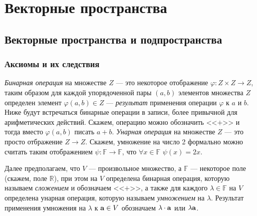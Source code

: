 \chapter{Векторные пространства}\label{lin_prostr}

\section{Векторные пространства и подпространства}

\subsection{Аксиомы и их следствия}

{\it Бинарная операция} на множестве $Z$ --- это некоторое отображение $\varphi : Z \times Z \to Z$,
таким образом для каждой упорядоченной пары $(a, b)$ элементов множества $Z$ определен элемент $\varphi (a, b)\in Z$ --- 
{\it результат} применения операции $\varphi$ к $a$ и $b$.
Ниже будут встречаться бинарные операции в записи, более привычной для арифметических действий. Скажем, операцию можно обозначить
<<$+$>>  и тогда вместо $\varphi (a, b)$ писать $a+b$.
{\it Унарная операция} на множестве $Z$ --- это просто отбражение $Z \to Z$. Скажем, умножение на число 2 
формально можно считать
таким отображением $\psi : \mathbb{F} \to \mathbb{F}$, что $\forall x\in \mathbb{F}$ $ \psi (x) = 2x$.

Далее предполагаем, что $V$ --- произвольное множество, а $\mathbb{F}$ --- 
некоторое поле (скажем, поле $\mathbb{R}$), при этом  на $V$  определена бинарная операция, которую называем
{\it сложением} и обозначаем <<$+$>>, а также  для каждого $\lambda \in \mathbb{F}$ на 
$V$ определена унарная операция, которую называем {\it умножением} на $\lambda$. 
Результат применения умножения на $\lambda$ к  $\mathbf{a} \in V$ обозначаем $\lambda \cdot \mathbf{a}$ или $\lambda \mathbf{a}$.

